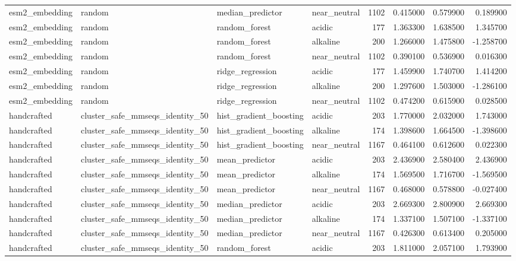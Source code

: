 \begin{longtable}{llllrrrr}
esm2\_embedding & random & median\_predictor & near\_neutral & 1102 & 0.415000 & 0.579900 & 0.189900 \\
esm2\_embedding & random & random\_forest & acidic & 177 & 1.363300 & 1.638500 & 1.345700 \\
esm2\_embedding & random & random\_forest & alkaline & 200 & 1.266000 & 1.475800 & -1.258700 \\
esm2\_embedding & random & random\_forest & near\_neutral & 1102 & 0.390100 & 0.536900 & 0.016300 \\
esm2\_embedding & random & ridge\_regression & acidic & 177 & 1.459900 & 1.740700 & 1.414200 \\
esm2\_embedding & random & ridge\_regression & alkaline & 200 & 1.297600 & 1.503000 & -1.286100 \\
esm2\_embedding & random & ridge\_regression & near\_neutral & 1102 & 0.474200 & 0.615900 & 0.028500 \\
handcrafted & cluster\_safe\_mmseqs\_identity\_50 & hist\_gradient\_boosting & acidic & 203 & 1.770000 & 2.032000 & 1.743000 \\
handcrafted & cluster\_safe\_mmseqs\_identity\_50 & hist\_gradient\_boosting & alkaline & 174 & 1.398600 & 1.664500 & -1.398600 \\
handcrafted & cluster\_safe\_mmseqs\_identity\_50 & hist\_gradient\_boosting & near\_neutral & 1167 & 0.464100 & 0.612600 & 0.022300 \\
handcrafted & cluster\_safe\_mmseqs\_identity\_50 & mean\_predictor & acidic & 203 & 2.436900 & 2.580400 & 2.436900 \\
handcrafted & cluster\_safe\_mmseqs\_identity\_50 & mean\_predictor & alkaline & 174 & 1.569500 & 1.716700 & -1.569500 \\
handcrafted & cluster\_safe\_mmseqs\_identity\_50 & mean\_predictor & near\_neutral & 1167 & 0.468000 & 0.578800 & -0.027400 \\
handcrafted & cluster\_safe\_mmseqs\_identity\_50 & median\_predictor & acidic & 203 & 2.669300 & 2.800900 & 2.669300 \\
handcrafted & cluster\_safe\_mmseqs\_identity\_50 & median\_predictor & alkaline & 174 & 1.337100 & 1.507100 & -1.337100 \\
handcrafted & cluster\_safe\_mmseqs\_identity\_50 & median\_predictor & near\_neutral & 1167 & 0.426300 & 0.613400 & 0.205000 \\
handcrafted & cluster\_safe\_mmseqs\_identity\_50 & random\_forest & acidic & 203 & 1.811000 & 2.057100 & 1.793900 \\

\end{longtable}
